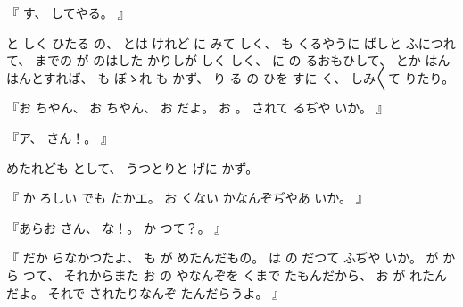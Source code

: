 『
す、
%
してやる。
』

と
しく
ひたる
の、
%
とは
けれど
に
みて
しく、
%
も
くるやうに
ばしと
ふにつれて、
%
までの
が
のはした
かりしが
しく
しく、
%
に
の
るおもひして、
%
とか
はん
はんとすれば、
%
も
ぼゝれ
も
かず、
%
り
る
の
ひを
すに
く、
%
しみ〳〵て
りたり。

『お
ちやん、
%
お
ちやん、
%
お
だよ。
%
お
。
%
されて
るぢや
いか。
』

『ア、
%
さん！。
』

めたれども
として、
%
うつとりと
げに
かず。

『
か
ろしい
でも
たかエ。
%
お
くない
かなんぞぢやあ
いか。
』

『あらお
さん、
%
な！。
%
か
つて？。
』

『
だか
らなかつたよ、
%
も
が
めたんだもの。
%
は
の
だつて
ふぢや
いか。
%
が
から
つて、
%
それからまた
お
の
やなんぞを
くまで
たもんだから、
%
お
が
れたんだよ。
%
それで
されたりなんぞ
たんだらうよ。
』

